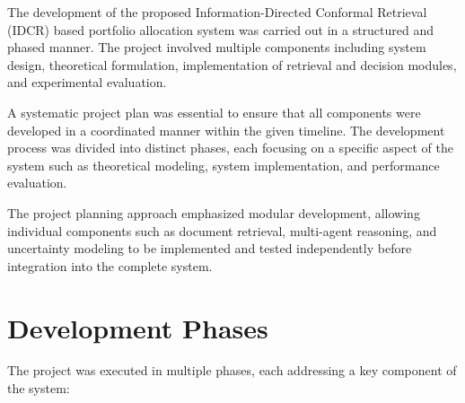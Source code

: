 \documentclass[12pt,a4paper,oneside]{report}
\theoremstyle{definition}
\theoremstyle{remark}
\begin{document}
The development of the proposed Information-Directed Conformal Retrieval (IDCR) based portfolio allocation system was carried out in a structured and phased manner. The project involved multiple components including system design, theoretical formulation, implementation of retrieval and decision modules, and experimental evaluation.

A systematic project plan was essential to ensure that all components were developed in a coordinated manner within the given timeline. The development process was divided into distinct phases, each focusing on a specific aspect of the system such as theoretical modeling, system implementation, and performance evaluation.

The project planning approach emphasized modular development, allowing individual components such as document retrieval, multi-agent reasoning, and uncertainty modeling to be implemented and tested independently before integration into the complete system.

\section{Development Phases}

The project was executed in multiple phases, each addressing a key component of the system:
\end{document}
